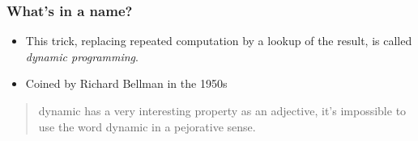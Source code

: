 \documentclass[presentation]{beamer}
\begin{document}
\begin{frame}
  \frametitle{What's in a name?}
  \begin{itemize}
  \item This trick, replacing repeated computation by a lookup of the
    result, is called \emph{dynamic programming}.
  \item Coined by Richard Bellman in the 1950s
  \end{itemize}
  \begin{quote}
    dynamic {\normalfont[\ldots]} has a very interesting property as an adjective,
    {\normalfont[\ldots]} it's impossible to use the word dynamic in a pejorative
    sense.
  \end{quote}
\end{frame}


\end{document}
